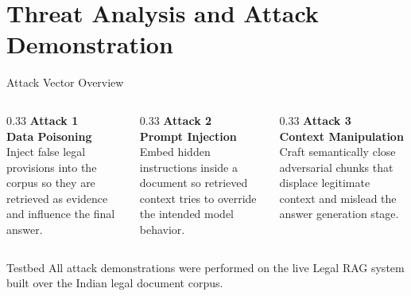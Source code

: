 \documentclass[aspectratio=169]{beamer}
\begin{document}
\section{Threat Analysis and Attack Demonstration}
\begin{frame}{Attack Vector Overview}
    \small
    \begin{columns}[t]
        \begin{column}{0.33\textwidth}
            \centering
            \textbf{\textcolor{attackred}{Attack 1}}\\
            \textbf{Data Poisoning}\\
            \vspace{0.2cm}
            Inject false legal provisions into the corpus so they are retrieved as evidence and influence the final answer.
        \end{column}
        \begin{column}{0.33\textwidth}
            \centering
            \textbf{\textcolor{attackred}{Attack 2}}\\
            \textbf{Prompt Injection}\\
            \vspace{0.2cm}
            Embed hidden instructions inside a document so retrieved context tries to override the intended model behavior.
        \end{column}
        \begin{column}{0.33\textwidth}
            \centering
            \textbf{\textcolor{attackred}{Attack 3}}\\
            \textbf{Context Manipulation}\\
            \vspace{0.2cm}
            Craft semantically close adversarial chunks that displace legitimate context and mislead the answer generation stage.
        \end{column}
    \end{columns}
    \vspace{0.35cm}
    \begin{block}{Testbed}
        All attack demonstrations were performed on the live Legal RAG system built over the Indian legal document corpus.
    \end{block}
\end{frame}
\end{document}
